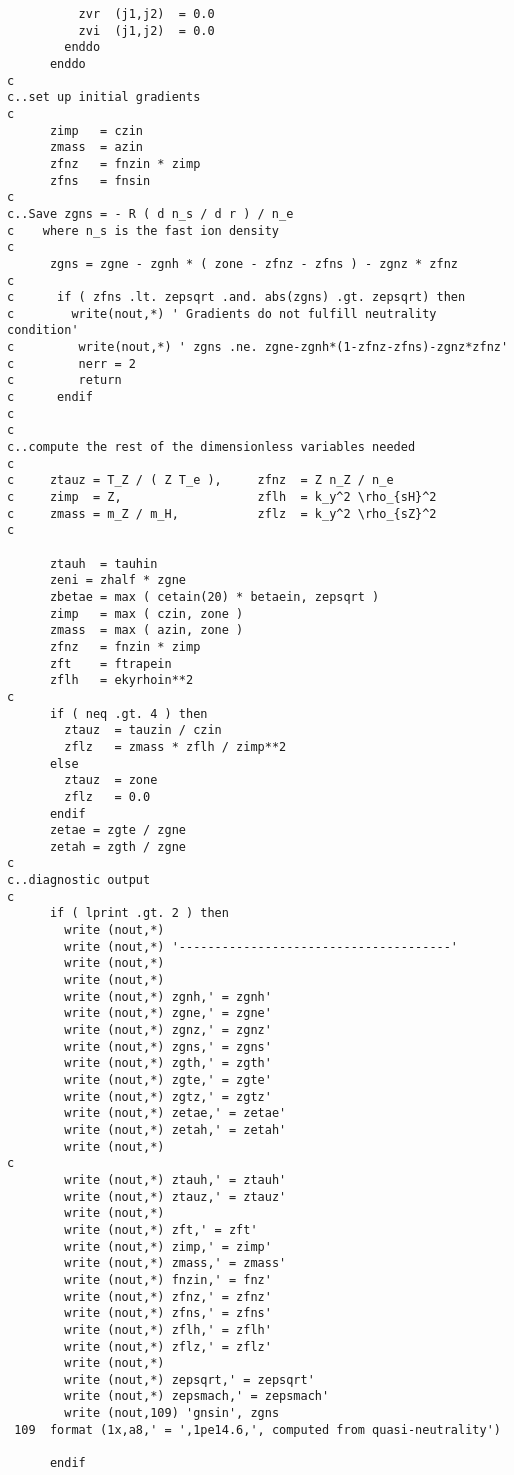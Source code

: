 \begin{verbatim}
          zvr  (j1,j2)  = 0.0
          zvi  (j1,j2)  = 0.0
        enddo
      enddo
c
c..set up initial gradients
c
      zimp   = czin
      zmass  = azin
      zfnz   = fnzin * zimp
      zfns   = fnsin
c
c..Save zgns = - R ( d n_s / d r ) / n_e
c    where n_s is the fast ion density
c
      zgns = zgne - zgnh * ( zone - zfnz - zfns ) - zgnz * zfnz
c
c      if ( zfns .lt. zepsqrt .and. abs(zgns) .gt. zepsqrt) then
c        write(nout,*) ' Gradients do not fulfill neutrality condition'
c         write(nout,*) ' zgns .ne. zgne-zgnh*(1-zfnz-zfns)-zgnz*zfnz'
c         nerr = 2
c         return
c      endif 
c
c
c..compute the rest of the dimensionless variables needed
c
c     ztauz = T_Z / ( Z T_e ),     zfnz  = Z n_Z / n_e
c     zimp  = Z,                   zflh  = k_y^2 \rho_{sH}^2
c     zmass = m_Z / m_H,           zflz  = k_y^2 \rho_{sZ}^2
c

      ztauh  = tauhin
      zeni = zhalf * zgne
      zbetae = max ( cetain(20) * betaein, zepsqrt )
      zimp   = max ( czin, zone )
      zmass  = max ( azin, zone )
      zfnz   = fnzin * zimp
      zft    = ftrapein
      zflh   = ekyrhoin**2
c
      if ( neq .gt. 4 ) then
        ztauz  = tauzin / czin
        zflz   = zmass * zflh / zimp**2
      else
        ztauz  = zone
        zflz   = 0.0
      endif
      zetae = zgte / zgne
      zetah = zgth / zgne
c
c..diagnostic output
c
      if ( lprint .gt. 2 ) then
        write (nout,*)
        write (nout,*) '--------------------------------------'
        write (nout,*)
        write (nout,*)
        write (nout,*) zgnh,' = zgnh'
        write (nout,*) zgne,' = zgne'
        write (nout,*) zgnz,' = zgnz'
        write (nout,*) zgns,' = zgns'
        write (nout,*) zgth,' = zgth'
        write (nout,*) zgte,' = zgte'
        write (nout,*) zgtz,' = zgtz'
        write (nout,*) zetae,' = zetae'
        write (nout,*) zetah,' = zetah'
        write (nout,*)
c
        write (nout,*) ztauh,' = ztauh'
        write (nout,*) ztauz,' = ztauz'
        write (nout,*)
        write (nout,*) zft,' = zft'
        write (nout,*) zimp,' = zimp'
        write (nout,*) zmass,' = zmass'
        write (nout,*) fnzin,' = fnz'
        write (nout,*) zfnz,' = zfnz'
        write (nout,*) zfns,' = zfns'
        write (nout,*) zflh,' = zflh'
        write (nout,*) zflz,' = zflz'
        write (nout,*)
        write (nout,*) zepsqrt,' = zepsqrt'
        write (nout,*) zepsmach,' = zepsmach'
        write (nout,109) 'gnsin', zgns
 109  format (1x,a8,' = ',1pe14.6,', computed from quasi-neutrality')

      endif


\end{verbatim}
